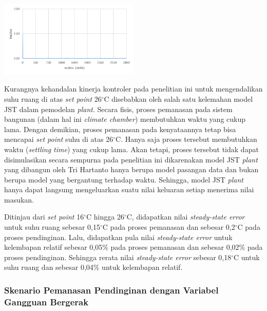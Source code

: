 \documentclass[a4paper,10pt]{article}
\makeatletter
\newenvironment{body}{\begin{multicols}{2}}{\end{multicols}}
\renewenvironment{figure}
{\def\@captype{figure}%
	\captionsetup{labelsep=period,format=hang,font=footnotesize,justification=justified}
}
{}
\makeatother
\begin{document}
\begin{body}
		\begin{figure}
			\centering
			\includegraphics[width=0.5\textwidth]{figures/Simulink1HT}
			\caption{Grafik Variabel Manipulasi \textit{Heater} pada Simulasi Simulink}
			\label{fig:5:SimulinkHT}
		\end{figure}
		\vspace{1em}
		
		Kurangnya kehandalan kinerja kontroler pada penelitian ini untuk mengendalikan suhu ruang di atas \textit{set point} 26$^\circ$C disebabkan oleh salah satu kelemahan model JST dalam pemodelan \textit{plant}. Secara fisis, proses pemanasan pada sistem bangunan (dalam hal ini \textit{climate chamber}) membutuhkan waktu yang cukup lama. Dengan demikian, proses pemanasan pada kenyataannya tetap bisa mencapai \textit{set point} suhu di atas 26$^\circ$C. Hanya saja proses tersebut membutuhkan waktu (\textit{settling time}) yang cukup lama. Akan tetapi, proses tersebut tidak dapat disimulasikan secara sempurna pada penelitian ini dikarenakan model JST \textit{plant} yang dibangun oleh Tri Hartanto\cite{skripsiTanto} hanya berupa model pasangan data dan bukan berupa model yang bergantung terhadap waktu. Sehingga, model JST \textit{plant} hanya dapat langsung mengeluarkan suatu nilai keluaran setiap menerima nilai masukan.
		
		Ditinjau dari \textit{set point} 16$^\circ$C hingga 26$^\circ$C, didapatkan nilai \textit{steady-state error} untuk suhu ruang sebesar 0,15$^\circ$C pada proses pemanasan dan sebesar 0,2$^\circ$C pada proses pendinginan. Lalu, didapatkan pula nilai \textit{steady-state error} untuk kelembapan relatif sebesar 0,05\% pada proses pemanasan dan sebesar 0,02\% pada proses pendinginan. Sehingga rerata nilai \textit{steady-state error} sebesar 0,18$^\circ$C untuk suhu ruang dan sebesar 0,04\% untuk kelembapan relatif.\\
		
		\subsubsection{Skenario Pemanasan Pendinginan dengan Variabel Gangguan Bergerak}
		

\end{body}
\end{document}

